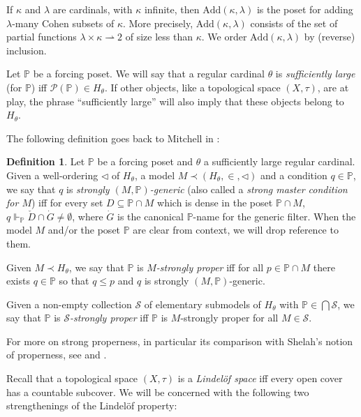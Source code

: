 \documentclass{amsart}
\theoremstyle{definition}
\newtheorem{definition}[theorem]{Definition}
\newcommand{\bb}{\mathbb}
\newcommand{\power}{\ensuremath{\mathscr{P}}}
\newcommand{\Add}{\mathrm{Add}}
\renewcommand{\P}{\bb{P}}
\renewcommand{\subset}{\subseteq}
\begin{document}
If $\kappa$ and $\lambda$ are cardinals, with $\kappa$ infinite, then $\Add(\kappa,\lambda)$ is the poset for adding $\lambda$-many Cohen subsets of $\kappa$. More precisely, $\Add(\kappa,\lambda)$ consists of the set of partial functions $\lambda \times\kappa \rightharpoonup 2$ of size less than $\kappa$. We order $\Add(\kappa,\lambda)$ by (reverse) inclusion.

Let $\P$ be a forcing poset. We will say that a regular cardinal $\theta$ is \emph{sufficiently large} (for $\P$) iff $\power(\P)\in H_\theta$. If other objects, like a topological space $(X,\tau)$, are at play, the phrase ``sufficiently large'' will also imply that these objects belong to $H_\theta$. 

The following definition goes back to Mitchell in \cite{mitchellAddingClosedUnbounded2005}:

\begin{definition}\label{stronglyProper}
Let $\P$ be a forcing poset and $\theta$ a sufficiently large regular cardinal. Given a well-ordering $\triangleleft$ of $H_\theta$, a model $M\prec (H_\theta,\in,\triangleleft)$ and a condition $q\in \P$, we say that $q$ is \emph{strongly $(M,\P)$-generic} (also called a \emph{strong master condition for $M$}) iff for every set $D\subset \P\cap M$ which is dense in the poset $\P \cap M$, $q\Vdash_\P \check D \cap \dot G\neq\emptyset$, where $\dot G$ is the canonical $\P$-name for the generic filter. When the model $M$ and/or the poset $\P$ are clear from context, we will drop reference to them.

Given $M\prec H_\theta$, we say that $\P$ is \emph{$M$-strongly proper} iff for all $p\in \P\cap M$ there exists $q\in \P$ so that $q\le p$ and $q$ is strongly $(M,\P)$-generic.

Given a non-empty collection $\mathcal{S}$ of elementary submodels of $H_\theta$ with $\P\in\bigcap\mathcal{S}$, we say that $\P$ is \emph{$\mathcal{S}$-strongly proper} iff $\P$ is $M$-strongly proper for all $M\in\mathcal{S}$.
\end{definition}

For more on strong properness, in particular its comparison with Shelah's notion of properness, see \cite[Section 3]{neemanForcingSequencesModels2014} and \cite[Section 3]{giltonPreservationTopologicalProperties2025}.

Recall that a topological space $(X,\tau)$ is a \emph{Lindel\"of space} iff every open cover has a countable subcover. We will be concerned with the following two strengthenings of the Lindel\"of property:
\end{document}
